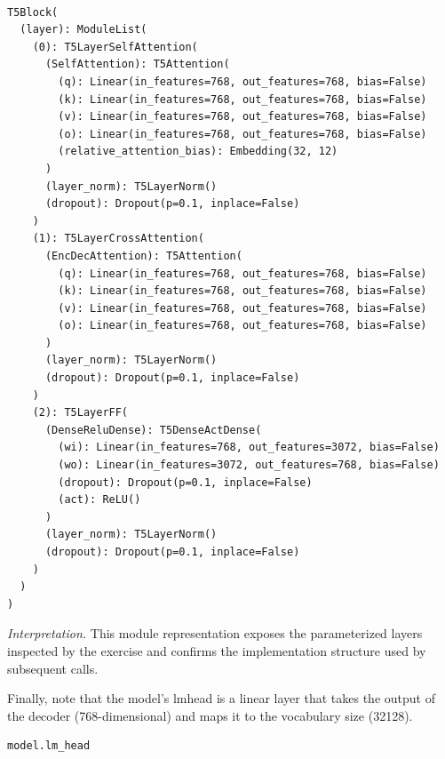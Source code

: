 \documentclass[../labs.tex]{subfiles}
\begin{document}
\begin{lstlisting}[basicstyle=\ttfamily\scriptsize,breaklines=true,breakatwhitespace=false,columns=fullflexible,keepspaces=true]

T5Block(
  (layer): ModuleList(
    (0): T5LayerSelfAttention(
      (SelfAttention): T5Attention(
        (q): Linear(in_features=768, out_features=768, bias=False)
        (k): Linear(in_features=768, out_features=768, bias=False)
        (v): Linear(in_features=768, out_features=768, bias=False)
        (o): Linear(in_features=768, out_features=768, bias=False)
        (relative_attention_bias): Embedding(32, 12)
      )
      (layer_norm): T5LayerNorm()
      (dropout): Dropout(p=0.1, inplace=False)
    )
    (1): T5LayerCrossAttention(
      (EncDecAttention): T5Attention(
        (q): Linear(in_features=768, out_features=768, bias=False)
        (k): Linear(in_features=768, out_features=768, bias=False)
        (v): Linear(in_features=768, out_features=768, bias=False)
        (o): Linear(in_features=768, out_features=768, bias=False)
      )
      (layer_norm): T5LayerNorm()
      (dropout): Dropout(p=0.1, inplace=False)
    )
    (2): T5LayerFF(
      (DenseReluDense): T5DenseActDense(
        (wi): Linear(in_features=768, out_features=3072, bias=False)
        (wo): Linear(in_features=3072, out_features=768, bias=False)
        (dropout): Dropout(p=0.1, inplace=False)
        (act): ReLU()
      )
      (layer_norm): T5LayerNorm()
      (dropout): Dropout(p=0.1, inplace=False)
    )
  )
)

\end{lstlisting}

\noindent\emph{Interpretation.} This module representation exposes the parameterized layers inspected by the exercise and confirms the implementation structure used by subsequent calls.



\noindent Finally, note that the model's lmhead is a linear layer that takes the output of the decoder (768-dimensional) and maps it to the vocabulary size (32128).

\begin{lstlisting}[language=Python,basicstyle=\ttfamily\scriptsize,breaklines=true,breakatwhitespace=false,columns=fullflexible,keepspaces=true,numbers=none]
model.lm_head
\end{lstlisting}

\hypertarget{res:lab02-text-01-t5-ipynb-67-f8b0967b2bec}{}
\end{document}
